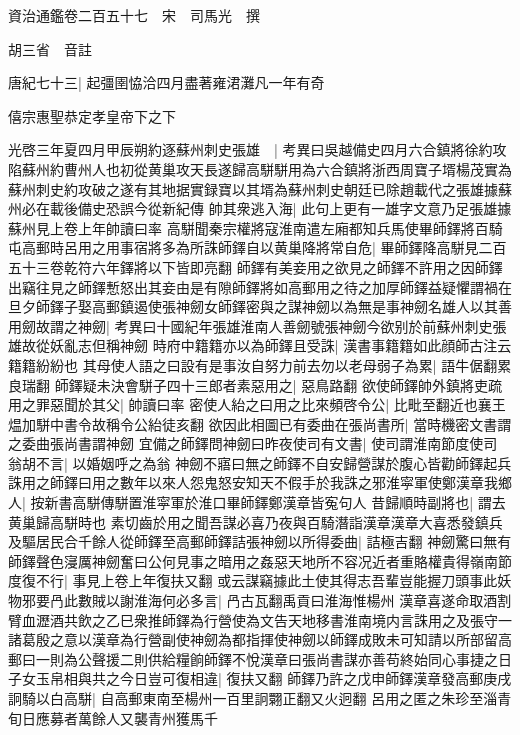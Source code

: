 資治通鑑卷二百五十七　宋　司馬光　撰

胡三省　音註

唐紀七十三|{
	起彊圉恊洽四月盡著雍涒灘凡一年有奇}


僖宗惠聖恭定孝皇帝下之下

光啓三年夏四月甲辰朔約逐蘇州刺史張雄　|{
	考異曰吳越備史四月六合鎮將徐約攻陷蘇州約曹州人也初從黄巢攻天長遂歸高駢駢用為六合鎮將浙西周寶子壻楊茂實為蘇州刺史約攻破之遂有其地据實録寶以其壻為蘇州刺史朝廷已除趙載代之張雄據蘇州必在載後備史恐誤今從新紀傳}
帥其衆逃入海|{
	此句上更有一雄字文意乃足張雄據蘇州見上卷上年帥讀曰率}
高駢聞秦宗權將寇淮南遣左廂都知兵馬使畢師鐸將百騎屯高郵時呂用之用事宿將多為所誅師鐸自以黄巢降將常自危|{
	畢師鐸降高駢見二百五十三卷乾符六年鐸將以下皆即亮翻}
師鐸有美妾用之欲見之師鐸不許用之因師鐸出竊往見之師鐸慙怒出其妾由是有隙師鐸將如高郵用之待之加厚師鐸益疑懼謂禍在旦夕師鐸子娶高郵鎮遏使張神劒女師鐸密與之謀神劒以為無是事神劒名雄人以其善用劒故謂之神劒|{
	考異曰十國紀年張雄淮南人善劒號張神劒今欲别於前蘇州刺史張雄故從妖亂志但稱神劒}
時府中籍籍亦以為師鐸且受誅|{
	漢書事籍籍如此顔師古注云籍籍紛紛也}
其母使人語之曰設有是事汝自努力前去勿以老母弱子為累|{
	語牛倨翻累良瑞翻}
師鐸疑未決會駢子四十三郎者素惡用之|{
	惡鳥路翻}
欲使師鐸帥外鎮將吏疏用之罪惡聞於其父|{
	帥讀曰率}
密使人紿之曰用之比來頻啓令公|{
	比毗至翻近也襄王煴加駢中書令故稱令公紿徒亥翻}
欲因此相圖已有委曲在張尚書所|{
	當時機密文書謂之委曲張尚書謂神劒}
宜備之師鐸問神劒曰昨夜使司有文書|{
	使司謂淮南節度使司}
翁胡不言|{
	以婚姻呼之為翁}
神劒不寤曰無之師鐸不自安歸營謀於腹心皆勸師鐸起兵誅用之師鐸曰用之數年以來人怨鬼怒安知天不假手於我誅之邪淮寜軍使鄭漢章我鄉人|{
	按新書高駢傳駢置淮寜軍於淮口畢師鐸鄭漢章皆寃句人}
昔歸順時副將也|{
	謂去黄巢歸高駢時也}
素切齒於用之聞吾謀必喜乃夜與百騎潛詣漢章漢章大喜悉發鎮兵及驅居民合千餘人從師鐸至高郵師鐸詰張神劒以所得委曲|{
	詰極吉翻}
神劒驚曰無有師鐸聲色寖厲神劒奮曰公何見事之暗用之姦惡天地所不容况近者重賂權貴得嶺南節度復不行|{
	事見上卷上年復扶又翻}
或云謀竊據此土使其得志吾輩豈能握刀頭事此妖物邪要冎此數賊以謝淮海何必多言|{
	冎古瓦翻禹貢曰淮海惟楊州}
漢章喜遂命取酒割臂血瀝酒共飲之乙巳衆推師鐸為行營使為文告天地移書淮南境内言誅用之及張守一諸葛殷之意以漢章為行營副使神劒為都指揮使神劒以師鐸成敗未可知請以所部留高郵曰一則為公聲援二則供給糧餉師鐸不悅漢章曰張尚書謀亦善苟終始同心事捷之日子女玉帛相與共之今日豈可復相違|{
	復扶又翻}
師鐸乃許之戊申師鐸漢章發高郵庚戌詗騎以白高駢|{
	自高郵東南至楊州一百里詗翾正翻又火迥翻}
呂用之匿之朱珍至淄青旬日應募者萬餘人又襲青州獲馬千

